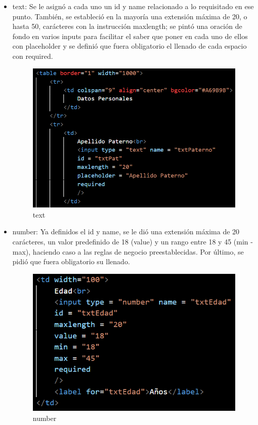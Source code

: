 \documentclass[10pt,a4paper]{article}
\begin{document}
\begin{itemize}
	\item  text: Se le asignó a cada uno un id y name relacionado a lo requisitado en ese punto. También, se estableció en la mayoría una extensión máxima de 20, o hasta 50, carácteres con la instrucción maxlength; se pintó una oración de fondo en varios inputs para facilitar el saber que poner en cada uno de ellos con placeholder y se definió que fuera obligatorio el llenado de cada espacio con required.
	
	\begin{figure}[H]
		\includegraphics[scale=.54]{Capture4}
		\centering
		\caption{text}
		\label{img:Capture4}
	\end{figure} 
	
	\item  number: Ya definidos el id y name, se le dió una extensión máxima de 20 carácteres, un valor predefinido de 18 (value) y un rango entre 18 y 45 (min - max), haciendo caso a las reglas de negocio preestablecidas. Por último, se pidió que fuera obligatorio su llenado.
	
	\begin{figure}[H]
		\includegraphics[scale=.54]{Capture5}
		\centering
		\caption{number}
		\label{img:Capture5}
	\end{figure} 
	

\end{itemize}
\end{document}
